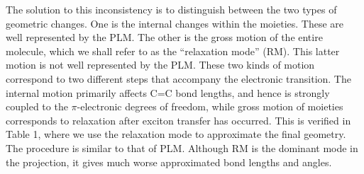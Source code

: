 


The solution to this inconsistency is to distinguish between the two types of geometric changes.
One is the internal changes within  the moieties.  These are well represented  by the PLM.
The other is the gross motion of the entire molecule, which we shall refer to as the ``relaxation mode'' (RM).  This latter motion
is not well represented by the PLM.
 These two kinds of motion  correspond to two different steps that accompany the electronic  transition. The
internal motion primarily affects C=C bond lengths,  and
hence is strongly coupled to the $\pi$-electronic degrees of freedom, while gross motion of moieties corresponds
to  relaxation after exciton transfer has occurred. This is verified in Table 1, where we use the relaxation mode to approximate the final geometry. The procedure is similar to that of PLM. Although RM is the dominant mode in the projection, it gives much worse approximated bond lengths and angles.


